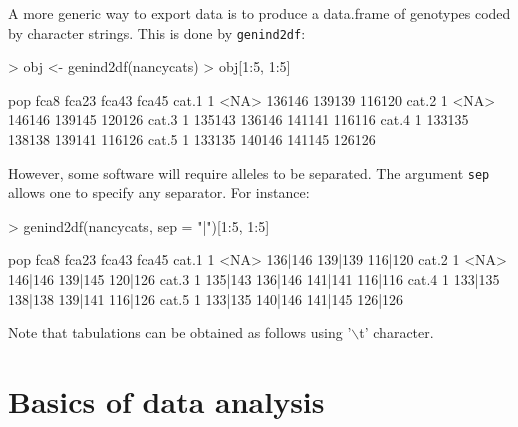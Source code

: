 \documentclass{article}
\begin{document}


A more generic way to export data is to produce a data.frame of genotypes
coded by character strings.
This is done by \texttt{genind2df}:
\begin{Schunk}
\begin{Sinput}
> obj <- genind2df(nancycats)
> obj[1:5, 1:5]
\end{Sinput}
\begin{Soutput}
      pop   fca8  fca23  fca43  fca45
cat.1   1   <NA> 136146 139139 116120
cat.2   1   <NA> 146146 139145 120126
cat.3   1 135143 136146 141141 116116
cat.4   1 133135 138138 139141 116126
cat.5   1 133135 140146 141145 126126
\end{Soutput}
\end{Schunk}

\noindent However, some software will require alleles to be
separated.
The argument \texttt{sep} allows one to specify any separator.
For instance:
\begin{Schunk}
\begin{Sinput}
> genind2df(nancycats, sep = "|")[1:5, 1:5]
\end{Sinput}
\begin{Soutput}
      pop    fca8   fca23   fca43   fca45
cat.1   1    <NA> 136|146 139|139 116|120
cat.2   1    <NA> 146|146 139|145 120|126
cat.3   1 135|143 136|146 141|141 116|116
cat.4   1 133|135 138|138 139|141 116|126
cat.5   1 133|135 140|146 141|145 126|126
\end{Soutput}
\end{Schunk}

Note that tabulations can be obtained as follows using '{$\backslash$}t' character.






\newpage
\section{Basics of data analysis}

\end{document}
